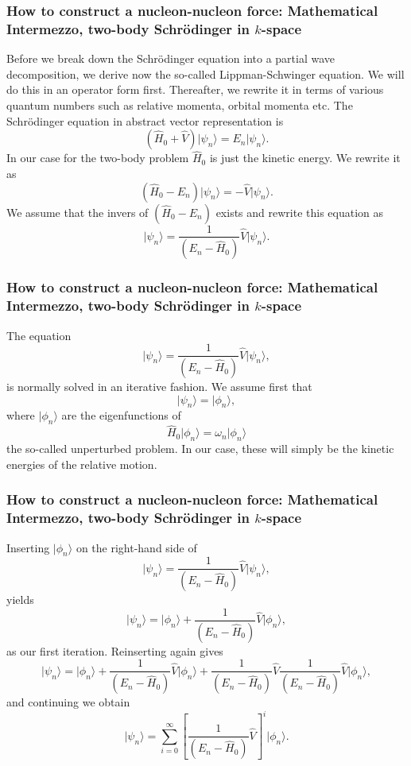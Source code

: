 \documentclass[compress]{beamer}
\begin{document}
\frame
{
\frametitle{How to construct a nucleon-nucleon force: Mathematical Intermezzo, two-body Schr\"odinger in $k$-space}
\begin{small}
{\scriptsize
Before we break down the Schr\"odinger equation into a partial wave decomposition, we derive now the so-called Lippman-Schwinger equation. We will do this in an operator form first.
Thereafter, we rewrite it in terms of various quantum numbers such as relative momenta, orbital momenta etc. 
The Schr\"odinger equation in abstract vector representation is
\[
  \left( \hat{H}_0 + \hat{V} \right) \vert \psi_n \rangle = E_n \vert\psi_n \rangle. 
\]
In our case for the two-body problem $\hat{H}_0$ is just the kinetic energy. 
We rewrite it as 
\[
\left( \hat{H}_0 -E_n \right)\vert\psi_n \rangle =-\hat{V}\vert \psi_n \rangle . 
\]
We assume that the invers of $\left( \hat{H}_0 -E_n\right)$ exists and rewrite this equation as
\[
\vert\psi_n \rangle =\frac{1}{\left( E_n -\hat{H}_0\right)}\hat{V}\vert \psi_n \rangle . 
\]
}
\end{small}
}


\frame
{
\frametitle{How to construct a nucleon-nucleon force: Mathematical Intermezzo, two-body Schr\"odinger in $k$-space}
\begin{small}
{\scriptsize
The equation
\[
\vert \psi_n \rangle =\frac{1}{\left( E_n -\hat{H}_0\right)}\hat{V}\vert \psi_n \rangle,
\]
is normally solved in an iterative fashion. 
We assume first that
\[
\vert\psi_n \rangle = \vert\phi_n \rangle,
\] 
where $\vert\phi_n \rangle$ are the eigenfunctions of 
\[
\hat{H}_0\vert \phi_n \rangle=\omega_n\vert \phi_n \rangle
\]
the so-called unperturbed problem. In our case, these will simply be the kinetic energies of the relative motion. 
}
\end{small}
}



\frame
{
\frametitle{How to construct a nucleon-nucleon force: Mathematical Intermezzo, two-body Schr\"odinger in $k$-space}
\begin{small}
{\scriptsize
Inserting  $\vert\phi_n \rangle$  on the right-hand side of 
\[
\vert \psi_n \rangle =\frac{1}{( E_n -\hat{H}_0)}\hat{V}\vert \psi_n \rangle,
\]
yields
\[
\vert \psi_n \rangle =\vert\phi_n \rangle+\frac{1}{\left( E_n -\hat{H}_0\right)}\hat{V}\vert \phi_n \rangle,
\]
as our first iteration. 
Reinserting again gives
\[
\vert \psi_n \rangle =\vert\phi_n \rangle+\frac{1}{\left( E_n -\hat{H}_0\right)}\hat{V}\vert \phi_n \rangle+\frac{1}{( E_n -\hat{H}_0)}\hat{V}\frac{1}{\left( E_n -\hat{H}_0\right)}\hat{V}\vert \phi_n \rangle,
\]
and continuing we obtain
\[
\vert \psi_n \rangle =\sum_{i=0}^{\infty}\left[\frac{1}{( E_n -\hat{H}_0)}\hat{V}\right]^i\vert \phi_n \rangle.
\]
}
\end{small}
}
\end{document}
